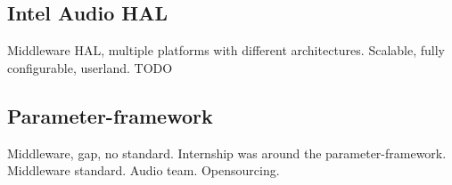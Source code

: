\subsection{Intel Audio HAL}
Middleware
HAL, multiple platforms with different architectures.
Scalable, fully configurable, userland.
TODO

\subsection{Parameter-framework}
\label{sec:parameter-framework}
Middleware, gap, no standard.
Internship was around the parameter-framework. Middleware standard. Audio team. Opensourcing.

